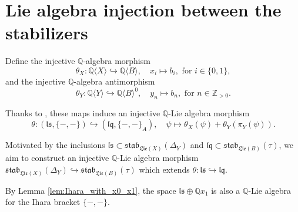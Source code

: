 \documentclass[11pt, a4paper]{amsart}
\numberwithin{equation}{section}
\theoremstyle{definition}
\newcommand{\Q}{\mathbb{Q}}
\newcommand{\QX}{\Q\langle X\rangle}
\newcommand{\QY}{\Q\langle Y\rangle}
\newcommand{\ls}{\mathfrak{ls}}
\newcommand{\QB}{\Q\langle B\rangle}
\newcommand{\lqq}{\mathfrak{lq}}
\newcommand{\Lie}{\mathfrak{Lie}}
\newcommand{\stab}{\mathfrak{stab}}
\begin{document}
\section{Lie algebra injection between the stabilizers} \label{sec:comparison}

Define the injective $\Q$-algebra morphism
\[
    \theta_X : \QX \hookrightarrow \QB, \quad x_i \mapsto b_i, \text{ for } i \in \{0, 1\},
\]
and the injective $\Q$-algebra antimorphism
\[
    \theta_Y : \QY \hookrightarrow \QB^0, \quad y_n \mapsto b_n, \text{ for } n \in \mathbb{Z}_{>0}.
\]

Thanks to \cite[Theorem 7.10]{Bu25}, these maps induce an injective $\Q$-Lie algebra morphism
\begin{equation} \label{eq:def_theta}
\theta : (\ls, \{-, -\}) \hookrightarrow (\lqq, \{-, -\}_A), \quad \psi \mapsto \theta_X(\psi) + \theta_Y(\pi_Y(\psi)).
\end{equation}

Motivated by the inclusions $\ls \subset \stab_{\Lie(X)}(\Delta_Y)$ and $\lqq \subset \stab_{\Lie(B)}(\tau)$, we aim to construct an injective $\Q$-Lie algebra morphism $\stab_{\Lie(X)}(\Delta_Y) \hookrightarrow \stab_{\Lie(B)}(\tau)$ which extends $\theta : \ls \hookrightarrow \lqq$.

By Lemma \ref{lem:Ihara_with_x0_x1}, the space $\ls \oplus \Q x_1$ is also a $\Q$-Lie algebra for the Ihara bracket $\{-,-\}$.
\end{document}
